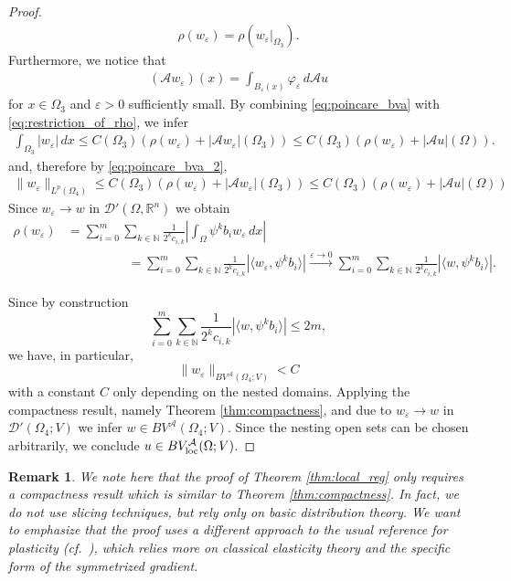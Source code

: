 \documentclass[11pt,reqno]{amsart}
\theoremstyle{plain}
\newtheorem{remark}[theorem]{Remark}
\theoremstyle{definition}
\theoremstyle{remark}
\numberwithin{equation}{section}
\newcommand{\R}{\mathbb{R}}
\newcommand{\N}{\mathbb{N}}
\newcommand{\A}{\mathcal{A}}
\newcommand{\D}{\mathcal{D}}
\newcommand{\e}{\varepsilon}
\newcommand{\1}{\mathbbm{1}} %
\begin{document}
\begin{proof}
\begin{align}
        \rho(w_\e) = \rho(w_\e|_{\Omega_3}).
    \end{align}
    Furthermore, we notice that
    \begin{align}
        (\A w_\e)(x) = \int_{B_\e(x)}\varphi_\e \, d \A u  
    \end{align}
    for $x \in \Omega_3$ and $\e > 0$ sufficiently small. By combining \eqref{eq:poincare_bva} with \eqref{eq:restriction_of_rho}, we infer
    \begin{align*}
        \int_{\Omega_3} |w_\e| \, dx \leq C(\Omega_3)(\rho(w_\e) + |\A w_\e |(\Omega_3)) \leq  C(\Omega_3) \left(\rho(w_\e) + | \A u |(\Omega) \right).
    \end{align*}
    and, therefore by \eqref{eq:poincare_bva_2},
    \begin{align*}
        \| w_\e \|_{L^p(\Omega_4)} \leq C(\Omega_3)(\rho(w_\e) + |\A w_\e|(\Omega_3)) \leq  C(\Omega_3) \left(\rho(w_\e) + | \A u |(\Omega) \right)
    \end{align*}
    Since $w_\e \to w$ in $\D'(\Omega, \R^n)$ we obtain
    \begin{align*}
        \rho(w_\e) &= \sum_{i = 0}^m \sum_{k \in \N} \frac{1}{2^kc_{i,k}} \left| \int_\Omega \psi^k b_iw_\e \, dx \right| \\
        & \hspace{2cm} = \sum_{i = 0}^m \sum_{k \in \N} \frac{1}{2^kc_{i,k}} \left| \langle w_\e, \psi^k b_i \rangle \right| \xrightarrow{\e \to 0} \sum_{i = 0}^m \sum_{k \in \N} \frac{1}{2^kc_{i,k}} \left| \langle w, \psi^k b_i \rangle \right|.
    \end{align*}
        
    Since by construction
    \[
        \sum_{i = 0}^m \sum_{k \in \N} \frac{1}{2^kc_{i,k}} \left| \langle w, \psi^k b_i \rangle \right| \leq 2m,
    \]
    we have, in particular,  
    \[
        \| w_\e \|_{BV^\A(\Omega_4; V)} < C
    \]
    with a constant $C$ only depending on the nested domains.
    Applying the compactness result, namely Theorem \ref{thm:compactness}, and due to $w_\e \to w$ in $\D'(\Omega_4; V)$ we infer $w \in BV^\A(\Omega_4; V)$. Since the nesting open sets can be chosen arbitrarily, we conclude $u \in BV^\A_{\rm loc}(\Omega; V)$.
\end{proof}

\begin{remark}
    We note here that the proof of Theorem \ref{thm:local_reg} only requires a compactness result which is similar to Theorem \ref{thm:compactness}. In fact, we do not use slicing techniques, but rely only on basic distribution theory. We want to emphasize that the proof uses a different approach to the usual reference for plasticity (cf.\ \cite{temam}), which relies more on classical elasticity theory and the specific form of the symmetrized gradient.
\end{remark}
\end{document}
